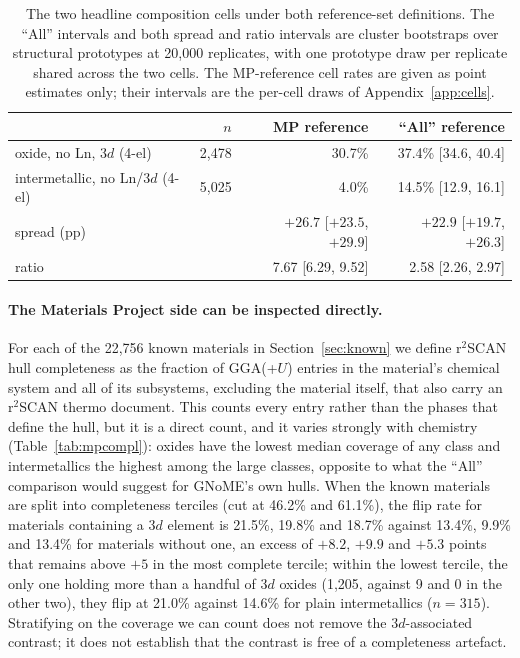 \documentclass[11pt]{article}
\begin{document}
\begin{table}[htbp]\centering
\caption{The two headline composition cells under both reference-set definitions. The
``All'' intervals and both spread and ratio intervals are cluster bootstraps over
structural prototypes at 20{,}000 replicates, with one prototype draw per replicate
shared across the two cells. The MP-reference cell rates are given as point estimates
only; their intervals are the per-cell draws of Appendix~\ref{app:cells}.}
\label{tab:allcells}
\small\begin{tabular}{lrrr}
\toprule
 & $n$ & MP reference & ``All'' reference \\
\midrule
oxide, no Ln, 3$d$ (4-el)        & 2{,}478 & 30.7\% & 37.4\% [34.6, 40.4] \\
intermetallic, no Ln/3$d$ (4-el) & 5{,}025 & \phantom{0}4.0\% & 14.5\% [12.9, 16.1] \\
\midrule
spread (pp)                      &         & $+26.7$ [$+23.5$, $+29.9$] & $+22.9$ [$+19.7$, $+26.3$] \\
ratio                            &         & 7.67 [6.29, 9.52] & 2.58 [2.26, 2.97] \\
\bottomrule
\end{tabular}
\end{table}

\paragraph{The Materials Project side can be inspected directly.} For each of the
22{,}756 known materials in Section~\ref{sec:known} we define r$^2$SCAN hull completeness
as the fraction of GGA(+$U$) entries in the material's chemical system and all of its
subsystems, excluding the material itself, that also carry an r$^2$SCAN thermo document.
This counts every entry rather than the phases that define the hull, but it is a direct
count, and it varies strongly with chemistry (Table~\ref{tab:mpcompl}): oxides have the
lowest median coverage of any class and intermetallics the highest among the large
classes, opposite to what the ``All'' comparison would suggest for GNoME's own hulls. When the known materials are split into completeness
terciles (cut at 46.2\% and 61.1\%), the flip rate for materials containing a 3$d$
element is 21.5\%, 19.8\% and 18.7\% against 13.4\%, 9.9\% and 13.4\% for materials
without one, an excess of $+8.2$, $+9.9$ and $+5.3$ points that remains above $+5$ in the most
complete tercile; within the lowest tercile, the only one holding more than a handful of
3$d$ oxides (1{,}205, against 9 and 0 in the other two), they flip at 21.0\% against
14.6\% for plain intermetallics ($n=315$). Stratifying on the coverage we can count does not remove the
3$d$-associated contrast; it does not establish that the contrast is free of a
completeness artefact.
\end{document}
